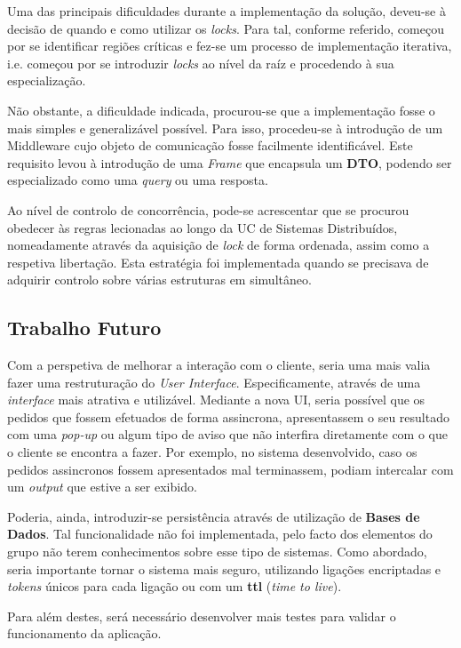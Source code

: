 \documentclass[a4paper,11pt]{article}
\begin{document}
Uma das principais dificuldades durante a implementação da solução, deveu-se à decisão de quando 
e como utilizar os \textit{locks}.
Para tal, conforme referido, começou por se identificar regiões críticas e fez-se
um processo de implementação iterativa, i.e. começou por se introduzir \textit{locks}
ao nível da raíz e procedendo à sua especialização.

Não obstante, a dificuldade indicada, procurou-se que a implementação fosse o mais simples
e generalizável possível. Para isso, procedeu-se à introdução de um Middleware cujo objeto
de comunicação fosse facilmente identificável. Este requisito levou à introdução de uma 
\textit{Frame} que encapsula um \textbf{DTO}, podendo ser especializado como uma \textit{query} ou uma resposta.

Ao nível de controlo de concorrência, pode-se acrescentar que se procurou obedecer
às regras lecionadas ao longo da UC de Sistemas Distribuídos, nomeadamente
através da aquisição de \textit{lock} de forma ordenada, assim como a respetiva
libertação. Esta estratégia foi implementada quando se precisava de adquirir controlo
sobre várias estruturas em simultâneo.

\subsection{Trabalho Futuro}

Com a perspetiva de melhorar a interação com o cliente, seria uma mais valia fazer
uma restruturação do \textit{User Interface}.
Especificamente, através de uma \textit{interface} mais atrativa e utilizável.
Mediante a nova UI, seria possível que os pedidos que fossem efetuados de forma assincrona,
apresentassem o seu resultado com uma \textit{pop-up} ou algum tipo de aviso que não interfira
diretamente com o que o cliente se encontra a fazer. Por exemplo, no sistema desenvolvido,
caso os pedidos assincronos fossem apresentados mal terminassem, podiam intercalar
com um \textit{output} que estive a ser exibido.

Poderia, ainda, introduzir-se persistência através de utilização de \textbf{Bases de Dados}.
Tal funcionalidade não foi implementada, pelo facto dos elementos do grupo não terem conhecimentos
sobre esse tipo de sistemas.
Como abordado, seria importante tornar o sistema mais seguro, utilizando ligações encriptadas e \textit{tokens}
únicos para cada ligação ou com um \textbf{ttl} (\textit{time to live}).

Para além destes, será necessário desenvolver mais testes para validar o funcionamento da aplicação.
\end{document}
